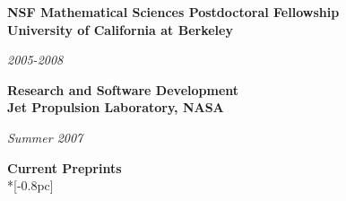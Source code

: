 \documentclass[11pt]{article}
\newcommand{\head}[1]{
  \vspace{10pt}
  {\Large \bf #1} \\*[-0.8pc]
  \underline{\hspace{6.07in}}}
\newcommand{\datedentry}[2]{
  \vspace{5pt}
  \begin{minipage}{5in}{\textbf{#1}}\end{minipage}
  \hfill
  \begin{minipage}{1in}{\hfill\textit{#2}}\end{minipage}
  }
\begin{document}
\vspace{7pt}

\datedentry{NSF Mathematical Sciences Postdoctoral Fellowship\\
University of California at Berkeley}{2005-2008}

\vspace{7pt}

\datedentry{Research and Software Development \\
Jet Propulsion Laboratory, NASA}{Summer 2007}
%
%
%
%
%
%
%
%
%
%
%
%
%
%
%


\head{Current Preprints}%
\end{document}
